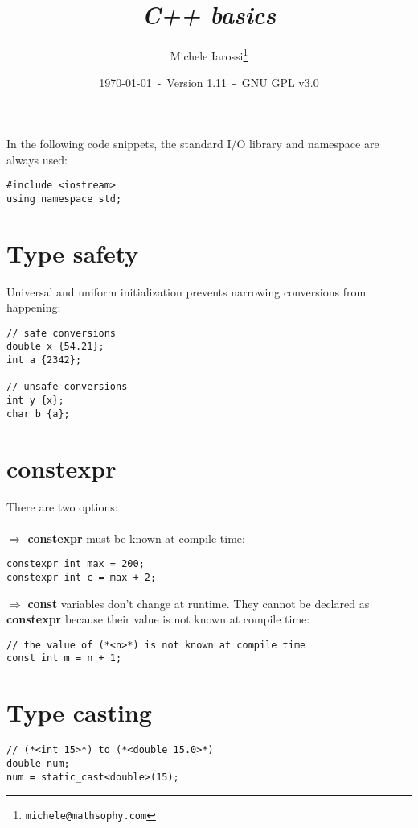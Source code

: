 \documentclass[10pt]{article}
\begin{document}
\title{\emph{C++ basics}}
\author{Michele Iarossi\thanks{\texttt{michele@mathsophy.com}}}
\date{\small \today~-~Version 1.11~-~GNU GPL v3.0}


\maketitle

\small

\begin{frame}{}
\setlength\columnsep{1cm}
\begin{multicols}{2}
  \tableofcontents
\end{multicols}
\end{frame}

\noindent
In the following code snippets, the standard I/O library and namespace are always used:
\begin{lstlisting}
#include <iostream>
using namespace std;
\end{lstlisting}
%
%
\section{Type safety}
\small
Universal and uniform initialization prevents narrowing
conversions from happening:
\begin{lstlisting}
// safe conversions
double x {54.21};
int a {2342};

// unsafe conversions
int y {x};
char b {a};
\end{lstlisting}
%
%
\section{constexpr}
\small
There are two options:\\ \\
$\Rightarrow$ \textbf{constexpr} must be known at compile time:
\begin{lstlisting}
constexpr int max = 200;
constexpr int c = max + 2;
\end{lstlisting}
$\Rightarrow$ \textbf{const} variables don't change at runtime. They cannot be declared as
\textbf{constexpr} because their value is not known at compile time:
\begin{lstlisting}
// the value of (*<n>*) is not known at compile time
const int m = n + 1;
\end{lstlisting}
%
%
\section{Type casting}
\small
\begin{lstlisting}
// (*<int 15>*) to (*<double 15.0>*)
double num;
num = static_cast<double>(15);
\end{lstlisting}
%
%
\end{document}
